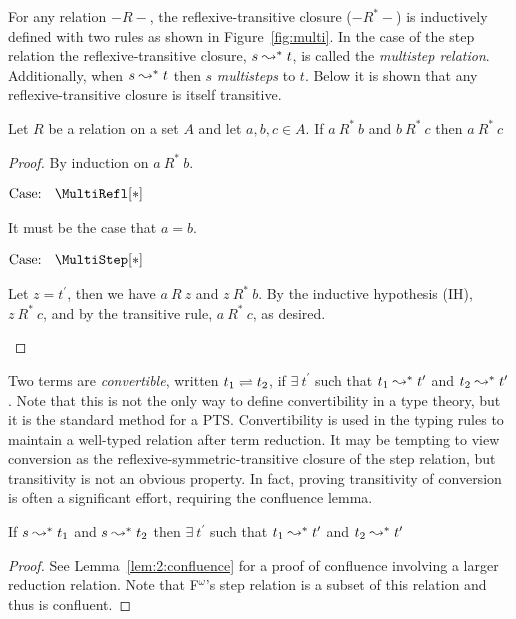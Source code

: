 

For any relation $-R-$, the reflexive-transitive closure ($-R^*-$) is inductively defined with two rules as shown in Figure~\ref{fig:multi}.
In the case of the step relation the reflexive-transitive closure, $s \leadsto^* t$, is called the \textit{multistep relation}.
Additionally, when $s \leadsto^* t$ then $s$ \textit{multisteps} to $t$.
Below it is shown that any reflexive-transitive closure is itself transitive.

\begin{lemma}
    Let $R$ be a relation on a set $A$ and let $a, b, c \in A$. If $a\ R^*\ b$ and $b\ R^*\ c$ then $a\ R^*\ c$
\end{lemma}
\begin{proof}
    By induction on $a\ R^*\ b$.

    $\text{Case: }\begin{array}{c} \MultiRefl[*] \end{array}$
    \begin{proofcase}
        It must be the case that $a = b$.
    \end{proofcase}

    $\text{Case: }\begin{array}{c} \MultiStep[*] \end{array}$
    \begin{proofcase}
        Let $z = t^\prime$, then we have $a\ R\ z$ and $z\ R^*\ b$.
        By the inductive hypothesis (IH), $z\ R^*\ c$, and by the transitive rule, $a\ R^*\ c$, as desired.
    \end{proofcase}
\end{proof}

Two terms are \textit{convertible}, written $t_1 \rightleftharpoons t_2$, if $\exists\ t^\prime$ such that $t_1 \leadsto^* t^\prime$ and $t_2 \leadsto^* t^\prime$.
Note that this is not the only way to define convertibility in a type theory, but it is the standard method for a PTS.
Convertibility is used in the typing rules to maintain a well-typed relation after term reduction.
It may be tempting to view conversion as the reflexive-symmetric-transitive closure of the step relation, but transitivity is not an obvious property.
In fact, proving transitivity of conversion is often a significant effort, requiring the confluence lemma.

\begin{lemma}[Confluence]
    If $s \leadsto^* t_1$ and $s \leadsto^* t_2$ then $\exists\ t^\prime$ such that $t_1 \leadsto^* t^\prime$ and $t_2 \leadsto^* t^\prime$
\end{lemma}
\begin{proof}
    See Lemma~\ref{lem:2:confluence} for a proof of confluence involving a larger reduction relation.
    Note that F$^\omega$'s step relation is a subset of this relation and thus is confluent.
\end{proof}

